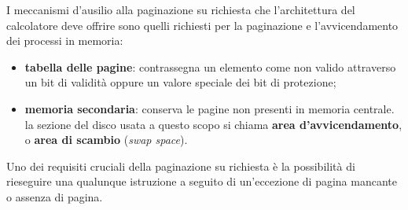 \documentclass[11pt,a4paper]{article}
\begin{document}
I
meccanismi d'ausilio alla paginazione su richiesta che l'architettura del calcolatore
deve offrire sono quelli richiesti per la paginazione e l'avvicendamento dei processi in memoria:
\begin{itemize}
  \item \textbf{tabella delle pagine}: contrassegna un elemento come non valido attraverso un bit di validità oppure un valore speciale dei bit di protezione;
  \item \textbf{memoria secondaria}: conserva le pagine non presenti in memoria centrale. la sezione del disco usata a questo scopo si chia­ma \textbf{area d'avvicendamento}, o \textbf{area di scambio} (\emph{swap space}).
\end{itemize}
%
Uno dei requisiti cruciali della paginazione su richiesta è la possibilità di rieseguire una qua­lunque istruzione a seguito di un'eccezione di pagina mancante o assenza di pagina.
\end{document}
